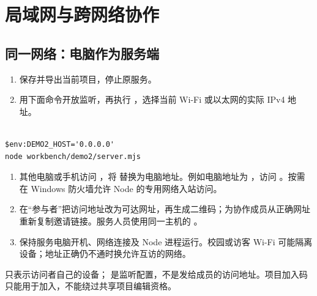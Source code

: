 \documentclass[UTF8,fontset=windows,zihao=-4,a4paper]{ctexart}
\begin{document}
\section{局域网与跨网络协作}\label{sec:3}

\subsection*{同一网络：电脑作为服务端}

\begin{enumerate}[start=1]

\item 保存并导出当前项目，停止原服务。

\item 用下面命令开放监听，再执行 ，选择当前 Wi-Fi 或以太网的实际 IPv4 地址。

\end{enumerate}


\begin{Verbatim}[fontsize=\small,breaklines=true,breakanywhere=true,frame=single,rulecolor=\color{Rule},framesep=7pt]

$env:DEMO2_HOST='0.0.0.0'
node workbench/demo2/server.mjs

\end{Verbatim}

\begin{enumerate}[start=3]

\item 其他电脑或手机访问 {\def\UrlBreaks{\do\/}}，将  替换为电脑地址。例如电脑地址为 ，访问 {\def\UrlBreaks{\do\/}}。按需在 Windows 防火墙允许 Node 的专用网络入站访问。

\item 在“参与者”把访问地址改为可达网址，再生成二维码；为协作成员从正确网址重新复制邀请链接。服务人员使用同一主机的 。

\item 保持服务电脑开机、网络连接及 Node 进程运行。校园或访客 Wi-Fi 可能隔离设备；地址正确仍不通时换允许互访的网络。

\end{enumerate}

 只表示访问者自己的设备； 是监听配置，不是发给成员的访问地址。项目加入码只能用于加入，不能绕过共享项目编辑资格。
\end{document}

